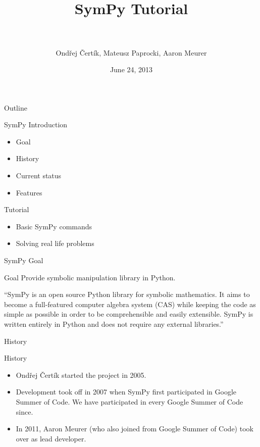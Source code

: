 \documentclass[xcolor=svgnames]{beamer}
\title[SymPy\hspace{4em}\insertframenumber/
\inserttotalframenumber]{~\\ SymPy Tutorial \\~}
\author[O. Čertík, M. Paprocki, A. Meurer]
{Ondřej Čertík, Mateusz Paprocki, Aaron Meurer}
\institute{\pgfuseimage{mylogo}}
\date{June 24, 2013}
\begin{document}
\begin{frame}
  \maketitle
\end{frame}

\begin{frame}{Outline}
  \begin{block}{SymPy Introduction}
    \begin{itemize}
    \item Goal
    \item History
    \item Current status
    \item Features
    \end{itemize}
  \end{block}

  \begin{block}{Tutorial}
    \begin{itemize}
    \item Basic SymPy commands
    \item Solving real life problems
    \end{itemize}
  \end{block}
\end{frame}

\begin{frame}{SymPy Goal}
  \begin{block}{Goal}
    Provide symbolic manipulation library in Python.
  \end{block}
  \pause
  \begin{block}

    ``SymPy is an open source Python library for symbolic mathematics. It aims to
    become a full-featured computer algebra system (CAS) while keeping the code as
    simple as possible in order to be comprehensible and easily extensible. SymPy
    is written entirely in Python and does not require any external libraries.''

  \end{block}
\end{frame}

\begin{frame}{History}
  \begin{block}{History}
    \begin{itemize}
    \item Ondřej Čertík started the project in 2005.
    \item Development took off in 2007 when SymPy first participated in Google
      Summer of Code. We have participated in every Google Summer of Code since.
    \item In 2011, Aaron Meurer (who also joined from Google Summer of Code) took
      over as lead developer.
    \end{itemize}
  \end{block}
\end{frame}
\end{document}
